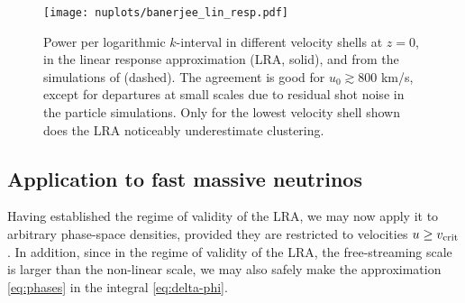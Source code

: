 \documentclass[useAMS, usenatbib]{mnras}
\begin{document}
\begin{figure}
  \texttt{[image: nuplots/banerjee\_lin\_resp.pdf]}
  \caption{Power per logarithmic $k$-interval in different velocity shells at $z = 0$, in the linear response approximation (LRA, solid), and from the simulations of \protect \cite{Banerjee_2018} (dashed). The agreement is good for $u_0 \gtrsim 800$ km/s, except for departures at small scales due to residual shot noise in the particle simulations. Only for the lowest velocity shell shown does the LRA noticeably underestimate clustering.
  }
  \label{fig:simvshell}
\end{figure}


\subsection{Application to fast massive neutrinos}

Having established the regime of validity of the LRA, we may now apply it to arbitrary phase-space densities, provided they are restricted to velocities $u \geq v_{\rm crit}$. In addition, since in the regime of validity of the LRA, the free-streaming scale is larger than the non-linear scale, we may also safely make the approximation \eqref{eq:phases} in the integral \eqref{eq:delta-phi}.
\end{document}
